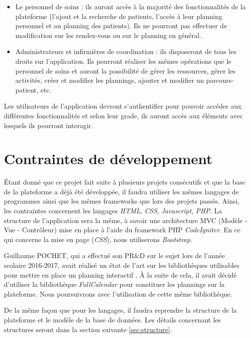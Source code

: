 \documentclass{polytech/polytech}
\begin{document}
\begin{itemize}
	\item Le personnel de soins : ils auront accès à la majorité des fonctionnalités de la plateforme (l'ajout et la recherche de patients, l'accès à leur planning personnel et au planning des patients). Ils ne pourront pas effectuer de modification sur les rendez-vous ou sur le planning en général.
	\item Administrateurs et infirmières de coordination : ils disposeront de tous les droits sur l'application. Ils pourront réaliser les mêmes opérations que le personnel de soins et auront la possibilité de gérer les ressources, gérer les activités, créer et modifier les plannings, ajouter et modifier un parcours-patient, etc.
\end{itemize}

Les utilisateurs de l'application devront s'authentifier pour pouvoir accéder aux différentes fonctionnalités et selon leur grade, ils auront accès aux éléments avec lesquels ils pourront interagir. 


\section{Contraintes de développement}

\'{E}tant donné que ce projet fait suite à plusieurs projets consécutifs et que la base de la plateforme a déjà été développée, il faudra utiliser les mêmes langages de programmes ainsi que les mêmes frameworks que lors des projets passés. Ainsi, les contraintes concernent les langages \textit{HTML}, \textit{CSS}, \textit{Javascript}, \textit{PHP}. La structure de l'application sera la même, à savoir une architecture MVC (Modèle - Vue - Contrôleur) mise en place à l'aide du framework PHP \textit{CodeIgniter}. En ce qui concerne la mise en page (\textit{CSS}), nous utiliserons \textit{Bootstrap}.

Guillaume POCHET, qui a effectué son PR\&D sur le sujet lors de l'année scolaire 2016-2017, avait réalisé un état de l'art sur les bibliothèques utilisables pour mettre en place un planning interactif \cite{pochet_outil_nodate}. À la suite de cela, il avait décidé d'utiliser la bibliothèque \textit{FullCalendar} pour constituer les plannings sur la plateforme. Nous poursuivrons avec l'utilisation de cette même bibliothèque.

De la même façon que pour les langages, il faudra reprendre la structure de la plateforme et le modèle de la base de données. Les détails concernant les structures seront dans la section suivante \autoref{sec:structure}.
\end{document}
